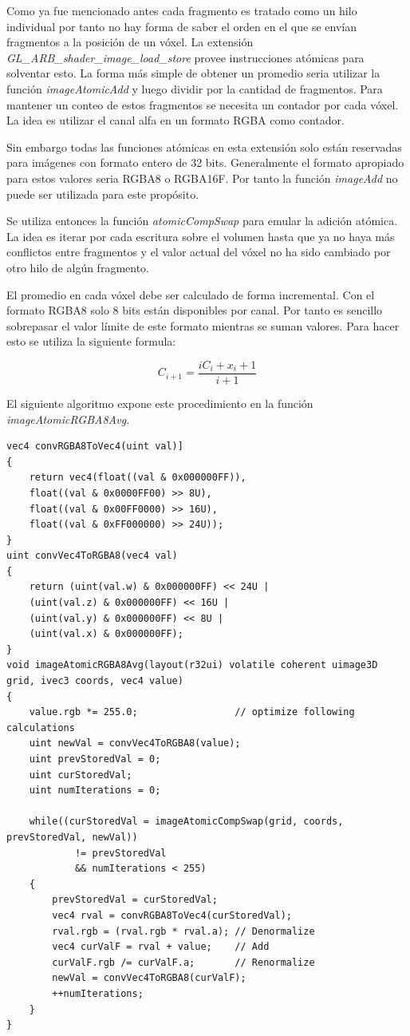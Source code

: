 Como ya fue mencionado antes cada fragmento es tratado como un hilo individual por tanto no hay forma de saber el orden en el que se envían fragmentos a la posición de un vóxel. La extensión \emph{{GL\_ARB\_shader\_image\_load\_store}} provee instrucciones atómicas para solventar esto. La forma más simple de obtener un promedio seria utilizar la función \emph{imageAtomicAdd} y luego dividir por la cantidad de fragmentos. Para mantener un conteo de estos fragmentos se necesita un contador por cada vóxel. La idea es utilizar el canal alfa en un formato RGBA como contador. 

Sin embargo todas las funciones atómicas en esta extensión solo están reservadas para imágenes con formato entero de 32 bits. Generalmente el formato apropiado para estos valores seria RGBA8 o RGBA16F. Por tanto la función \emph{imageAdd} no puede ser utilizada para este propósito.

Se utiliza entonces la función \emph{atomicCompSwap} para emular la adición atómica. La idea es iterar por cada escritura sobre el volumen hasta que ya no haya más conflictos entre fragmentos y el valor actual del vóxel no ha sido cambiado por otro hilo de algún fragmento.

El promedio en cada vóxel debe ser calculado de forma incremental. Con el formato RGBA8 solo 8 bits están disponibles por canal. Por tanto es sencillo sobrepasar el valor límite de este formato mientras se suman valores. Para hacer esto se utiliza la siguiente formula:

\begin{equation}
	C_{i+1} = \frac{iC_{i}+x_i+1}{i+1}
\end{equation}

El siguiente algoritmo expone este procedimiento en la función \emph{imageAtomicRGBA8Avg}.
\\
\begin{lstlisting}[caption={Conversion entre RGBA8 y R32UI y promedio incremental.}, label=imageAtomicRGBA8Avg]
vec4 convRGBA8ToVec4(uint val)]
{
    return vec4(float((val & 0x000000FF)), 
    float((val & 0x0000FF00) >> 8U), 
    float((val & 0x00FF0000) >> 16U), 
    float((val & 0xFF000000) >> 24U));
}
uint convVec4ToRGBA8(vec4 val)
{
    return (uint(val.w) & 0x000000FF) << 24U | 
    (uint(val.z) & 0x000000FF) << 16U | 
    (uint(val.y) & 0x000000FF) << 8U | 
    (uint(val.x) & 0x000000FF);
}
void imageAtomicRGBA8Avg(layout(r32ui) volatile coherent uimage3D grid, ivec3 coords, vec4 value)
{
    value.rgb *= 255.0;                 // optimize following calculations
    uint newVal = convVec4ToRGBA8(value);
    uint prevStoredVal = 0;
    uint curStoredVal;
    uint numIterations = 0;

    while((curStoredVal = imageAtomicCompSwap(grid, coords, prevStoredVal, newVal)) 
            != prevStoredVal
            && numIterations < 255)
    {
        prevStoredVal = curStoredVal;
        vec4 rval = convRGBA8ToVec4(curStoredVal);
        rval.rgb = (rval.rgb * rval.a); // Denormalize
        vec4 curValF = rval + value;    // Add
        curValF.rgb /= curValF.a;       // Renormalize
        newVal = convVec4ToRGBA8(curValF);
        ++numIterations;
    }
}
\end{lstlisting}

